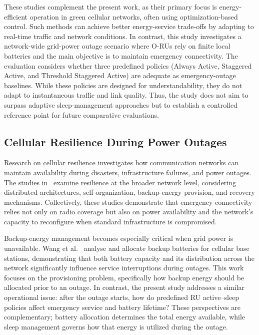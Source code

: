 These studies complement the present work, as their primary focus is energy-efficient operation in green cellular networks, often using optimization-based control. Such methods can achieve better energy-service trade-offs by adapting to real-time traffic and network conditions. In contrast, this study investigates a network-wide grid-power outage scenario where O-RUs rely on finite local batteries and the main objective is to maintain emergency connectivity. The evaluation considers whether three predefined policies (Always Active, Staggered Active, and Threshold Staggered Active) are adequate as emergency-outage baselines. While these policies are designed for understandability, they do not adapt to instantaneous traffic and link quality. Thus, the study does not aim to surpass adaptive sleep-management approaches but to establish a controlled reference point for future comparative evaluations.

\subsection{Cellular Resilience During Power Outages}

Research on cellular resilience investigates how communication networks can maintain availability during disasters, infrastructure failures, and power outages. The studies in~\cite{gomez2014disasterResilient,zhang2016selfOrganization,karaman2025resilientInfrastructure} examine resilience at the broader network level, considering distributed architectures, self-organization, backup-energy provision, and recovery mechanisms. Collectively, these studies demonstrate that emergency connectivity relies not only on radio coverage but also on power availability and the network's capacity to reconfigure when standard infrastructure is compromised.

Backup-energy management becomes especially critical when grid power is unavailable. Wang et al.~\cite{wang2019backupBattery} analyse and allocate backup batteries for cellular base stations, demonstrating that both battery capacity and its distribution across the network significantly influence service interruptions during outages. This work focuses on the provisioning problem, specifically how backup energy should be allocated prior to an outage. In contrast, the present study addresses a similar operational issue: after the outage starts, how do predefined RU active--sleep policies affect emergency service and battery lifetime? These perspectives are complementary; battery allocation determines the total energy available, while sleep management governs how that energy is utilized during the outage.

